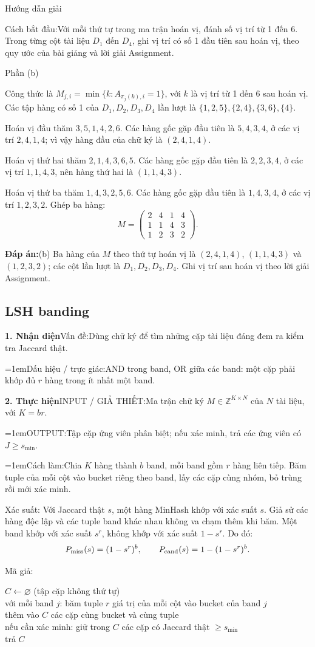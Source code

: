 \documentclass[10pt,a4paper,twocolumn]{article}
\makeatletter
\newcommand{\maptag}[1]{\phantomsection\@bsphack\protected@write\@auxout{}{\string\newlabel{#1}{{}{\thepage}{}{\@currentHref}{}}}\@esphack}
\newif\ifexamheadingprinted
\newcommand{\topic}[2]{%
  \global\examheadingprintedfalse\par\subsection{#2}\label{topic:#1}}
\newcommand{\key}[1]{#1:\enspace}
\newcommand{\solutionprompt}[1]{\par\addvspace{1pt}\noindent\key{Cách bắt đầu}#1\par\addvspace{2pt}}
\newcommand{\blocklabel}[1]{\par\noindent#1\par\nobreak}
\newcommand{\answer}[1]{%
  \par\addvspace{3pt}%
  \blocklabel{#1Hướng dẫn giải}}
\newcommand{\finalanswer}[1]{%
  \par\addvspace{3pt}\noindent\textbf{Đáp án:}\nobreak\enspace#1\par}
\newcommand{\guidepart}[1]{%
  \par\addvspace{1.5pt}%
  \blocklabel{Phần #1}}
\newcommand{\algfield}[2]{\par\noindent\hangindent=1em\relax#1:\enspace#2}
\newcommand{\unitfield}[4]{%
  \par\noindent\textbf{#1. #2}\enspace #3:\enspace #4}
\newcommand{\algsummary}[6]{%
  \begingroup\setlength{\parskip}{1pt}%
  \unitfield{1}{Nhận diện}{Vấn đề}{#1}%
  \algfield{Dấu hiệu / trực giác}{#2}%
  \if\relax\detokenize{#3}\relax\else\par\noindent#3\par\fi%
  \unitfield{2}{Thực hiện}{INPUT / GIẢ THIẾT}{#4}%
  \algfield{OUTPUT}{#5}%
  \algfield{Cách làm}{#6}\par\endgroup}
\newenvironment{algpseudo}{%
  \par\addvspace{2pt}\noindent
  \setlength{\parskip}{0pt}%
  Mã giả:\par\nobreak
  \begin{list}{}{\setlength{\leftmargin}{1em}\setlength{\topsep}{0pt}%
    \setlength{\partopsep}{0pt}\setlength{\parsep}{0pt}%
    \@beginparpenalty=10000\relax}%
  \item\relax
}{\end{list}\par\addvspace{3pt}}
\makeatother
\begin{document}
\answer{\maptag{answer:A1-Q2b}\maptag{answer:P24-Q2b}}
\solutionprompt{Với mỗi thứ tự trong ma trận hoán vị, đánh số vị trí từ 1 đến 6. Trong từng cột tài liệu $D_1$ đến $D_4$, ghi vị trí có số 1 đầu tiên sau hoán vị, theo quy ước của bài giảng và lời giải Assignment.}
\guidepart{(b)}
\begin{guidesteps}
\item Công thức là $M_{j,i}=\min\{k:A_{\pi_j(k),i}=1\}$, với $k$ là vị trí từ 1 đến 6 sau hoán vị. Các tập hàng có số 1 của $D_1,D_2,D_3,D_4$ lần lượt là $\{1,2,5\},\{2,4\},\{3,6\},\{4\}$.
\item Hoán vị đầu thăm $3,5,1,4,2,6$. Các hàng gốc gặp đầu tiên là $5,4,3,4$, ở các vị trí $2,4,1,4$; vì vậy hàng đầu của chữ ký là $(2,4,1,4)$.
\item Hoán vị thứ hai thăm $2,1,4,3,6,5$. Các hàng gốc gặp đầu tiên là $2,2,3,4$, ở các vị trí $1,1,4,3$, nên hàng thứ hai là $(1,1,4,3)$.
\item Hoán vị thứ ba thăm $1,4,3,2,5,6$. Các hàng gốc gặp đầu tiên là $1,4,3,4$, ở các vị trí $1,2,3,2$. Ghép ba hàng:
\[
M=\begin{pmatrix}2&4&1&4\\1&1&4&3\\1&2&3&2\end{pmatrix}.
\]
\end{guidesteps}
\finalanswer{(b) Ba hàng của $M$ theo thứ tự hoán vị là $(2,4,1,4)$, $(1,1,4,3)$ và $(1,2,3,2)$; các cột lần lượt là $D_1,D_2,D_3,D_4$. Ghi vị trí sau hoán vị theo lời giải Assignment.}
\topic{banding}{LSH banding}

\algsummary{Dùng chữ ký để tìm những cặp tài liệu đáng đem ra kiểm tra Jaccard thật.}{AND trong band, OR giữa các band: một cặp phải khớp đủ $r$ hàng trong ít nhất một band.}{}{Ma trận chữ ký $M\in\mathbb Z^{K\times N}$ của $N$ tài liệu, với $K=br$.}{Tập cặp ứng viên phân biệt; nếu xác minh, trả các ứng viên có $J\ge s_{\min}$.}{Chia $K$ hàng thành $b$ band, mỗi band gồm $r$ hàng liên tiếp. Băm tuple của mỗi cột vào bucket riêng theo band, lấy các cặp cùng nhóm, bỏ trùng rồi mới xác minh.}

\key{Xác suất} Với Jaccard thật $s$, một hàng MinHash khớp với xác suất $s$. Giả sử các hàng độc lập và các tuple band khác nhau không va chạm thêm khi băm. Một band khớp với xác suất $s^r$, không khớp với xác suất $1-s^r$. Do đó:
\[
P_{\rm miss}(s)=(1-s^r)^b,\qquad P_{\rm cand}(s)=1-(1-s^r)^b.
\]

\begin{algpseudo}
$C\gets\varnothing$ (tập cặp không thứ tự)\\
với mỗi band $j$: băm tuple $r$ giá trị của mỗi cột vào bucket của band $j$\\
\quad thêm vào $C$ các cặp cùng bucket và cùng tuple\\
nếu cần xác minh: giữ trong $C$ các cặp có Jaccard thật $\ge s_{\min}$\\
trả $C$
\end{algpseudo}
\end{document}
